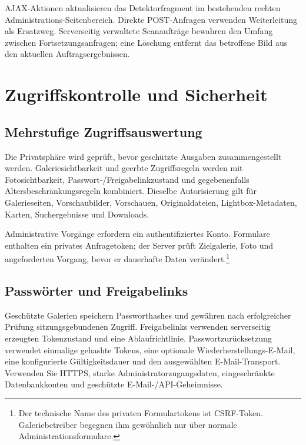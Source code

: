 \documentclass[11pt,a4paper]{article}
\begin{document}
AJAX-Aktionen aktualisieren das Detektorfragment im bestehenden rechten
Administrations-Seitenbereich. Direkte POST-Anfragen verwenden Weiterleitung als
Ersatzweg. Serverseitig verwaltete Scanaufträge bewahren den Umfang zwischen
Fortsetzungsanfragen; eine Löschung entfernt das betroffene Bild aus den
aktuellen Auftragsergebnissen.
\section{Zugriffskontrolle und Sicherheit}
\label{sec:security}

\subsection{Mehrstufige Zugriffsauswertung}

Die Privatsphäre wird geprüft, bevor geschützte Ausgaben zusammengestellt
werden. Galeriesichtbarkeit und geerbte Zugriffsregeln werden mit
Fotosichtbarkeit, Passwort-/Freigabelinkzustand und gegebenenfalls
Altersbeschränkungsregeln kombiniert. Dieselbe Autorisierung gilt für
Galerieseiten, Vorschaubilder, Vorschauen, Originaldateien, Lightbox-Metadaten,
Karten, Suchergebnisse und Downloads.

Administrative Vorgänge erfordern ein authentifiziertes Konto. Formulare
enthalten ein privates Anfragetoken; der Server prüft Zielgalerie, Foto und
angeforderten Vorgang, bevor er dauerhafte Daten verändert.\footnote{Der
technische Name des privaten Formulartokens ist CSRF-Token. Galeriebetreiber
begegnen ihm gewöhnlich nur über normale Administrationsformulare.}

\subsection{Passwörter und Freigabelinks}

Geschützte Galerien speichern Passworthashes und gewähren nach erfolgreicher
Prüfung sitzungsgebundenen Zugriff. Freigabelinks verwenden serverseitig
erzeugten Tokenzustand und eine Ablaufrichtlinie. Passwortzurücksetzung
verwendet einmalige gehashte Tokens, eine optionale
Wieder\-her\-stel\-lungs-E-Mail, eine konfigurierte Gültigkeitsdauer und den
ausgewählten E-Mail-Transport. Verwenden Sie HTTPS, starke
Administratorzugangsdaten, eingeschränkte Datenbankkonten und geschützte
E-Mail-/API-Geheimnisse.
\end{document}
